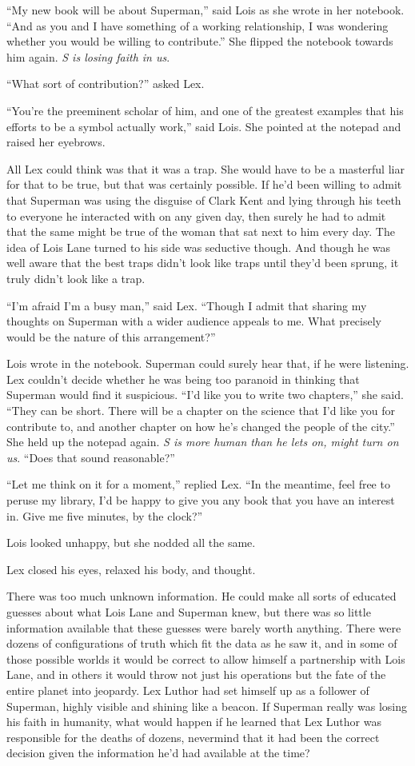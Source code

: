 \documentclass[ebook,12pt]{memoir}
\begin{document}
``My new book will be about Superman,'' said Lois as she wrote in her
notebook. ``And as you and I have something of a working relationship, I
was wondering whether you would be willing to contribute.'' She flipped
the notebook towards him again. \emph{S is losing faith in us}.

``What sort of contribution?'' asked Lex.

``You're the preeminent scholar of him, and one of the greatest examples
that his efforts to be a symbol actually work,'' said Lois. She pointed
at the notepad and raised her eyebrows.

All Lex could think was that it was a trap. She would have to be a
masterful liar for that to be true, but that was certainly possible. If
he'd been willing to admit that Superman was using the disguise of Clark
Kent and lying through his teeth to everyone he interacted with on any
given day, then surely he had to admit that the same might be true of
the woman that sat next to him every day. The idea of Lois Lane turned
to his side was seductive though. And though he was well aware that the
best traps didn't look like traps until they'd been sprung, it truly
didn't look like a trap.

``I'm afraid I'm a busy man,'' said Lex. ``Though I admit that sharing
my thoughts on Superman with a wider audience appeals to me. What
precisely would be the nature of this arrangement?''

Lois wrote in the notebook. Superman could surely hear that, if he were
listening. Lex couldn't decide whether he was being too paranoid in
thinking that Superman would find it suspicious. ``I'd like you to write
two chapters,'' she said. ``They can be short. There will be a chapter
on the science that I'd like you for contribute to, and another chapter
on how he's changed the people of the city.'' She held up the notepad
again. \emph{S is more human than he lets on, might turn on us}. ``Does
that sound reasonable?''

``Let me think on it for a moment,'' replied Lex. ``In the meantime,
feel free to peruse my library, I'd be happy to give you any book that
you have an interest in. Give me five minutes, by the clock?''

Lois looked unhappy, but she nodded all the same.

Lex closed his eyes, relaxed his body, and thought.

There was too much unknown information. He could make all sorts of
educated guesses about what Lois Lane and Superman knew, but there was
so little information available that these guesses were barely worth
anything. There were dozens of configurations of truth which fit the
data as he saw it, and in some of those possible worlds it would be
correct to allow himself a partnership with Lois Lane, and in others it
would throw not just his operations but the fate of the entire planet
into jeopardy. Lex Luthor had set himself up as a follower of Superman,
highly visible and shining like a beacon. If Superman really was losing
his faith in humanity, what would happen if he learned that Lex Luthor
was responsible for the deaths of dozens, nevermind that it had been the
correct decision given the information he'd had available at the time?
\end{document}
